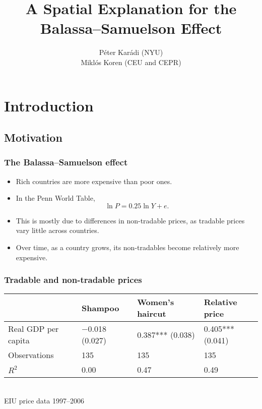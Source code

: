 \documentclass[compress,mathserif]{beamer}
\title[Balassa--Samuelson]%
{A Spatial Explanation for the\\ Balassa--Samuelson Effect}
\author[Kar\'adi and Koren] %
{P\'eter Kar\'adi (NYU)\\
Mikl\'os Koren (CEU and CEPR)}
\date %
{}
\newcounter{perc}
\newcounter{percek}
\renewcommand{\time}[1]{\addtocounter{percek}{#1}}
\begin{document}
\begin{frame}[plain]
  \titlepage
    \addtocounter{framenumber}{-1}
\end{frame}


\section{Introduction}

\subsection{Motivation}
\begin{frame}\frametitle{The Balassa--Samuelson effect}

\begin{itemize}
    \item Rich countries are more expensive than poor ones.
    \item In the Penn World Table,
    \[
    \ln P = 0.25\ln Y + e.
    \]
    \pause
    \item This is mostly due to differences in non-tradable prices, as tradable prices vary little across countries.
    \item Over time, as a country grows, its non-tradables become relatively more expensive.
\end{itemize}
\end{frame}

\time{2}

\begin{frame}\frametitle{Tradable and non-tradable prices}
\begin{center}
\begin{tabular}{lm{5em}m{5em}m{5em}}
  \hline
   & Shampoo & Women's haircut & Relative price\\
   \hline
  Real GDP per capita & $-$0.018   (0.027) & 0.387***   (0.038) & 0.405***   (0.041)\\
\hline
  Observations &  135 & 135 & 135 
\\
  $R^2$ &  0.00& 0.47 & 0.49
\\
  \hline
\end{tabular}\\
{\small EIU price data 1997--2006}
\end{center}
\end{frame}
\end{document}
